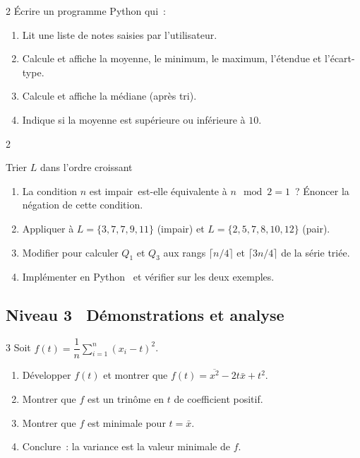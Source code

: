 \begin{exo}{2}
\'Ecrire un programme Python qui~:
\begin{enumerate}
  \item Lit une liste de notes saisies par l'utilisateur.
  \item Calcule et affiche la moyenne, le minimum, le maximum,
        l'\'etendue et l'\'ecart-type.
  \item Calcule et affiche la m\'ediane (apr\`es tri).
  \item Indique si la moyenne est sup\'erieure ou inf\'erieure \`a $10$.
\end{enumerate}
\end{exo}

\begin{exo}{2}

\begin{algorithm}[H]
\caption{Calcul de la m\'ediane d'une s\'erie}
Trier $L$ dans l'ordre croissant\;
\end{algorithm}

\begin{enumerate}
  \item La condition \og$n$ est impair\fg\ est-elle \'equivalente \`a
        \og$n\mod2=1$\fg~? \'Enoncer la n\'egation de cette condition.
  \item Appliquer \`a $L=\{3,7,7,9,11\}$ (impair) et
        $L=\{2,5,7,8,10,12\}$ (pair).
  \item Modifier pour calculer $Q_1$ et $Q_3$ aux rangs
        $\lceil n/4\rceil$ et $\lceil3n/4\rceil$ de la s\'erie tri\'ee.
  \item Impl\'ementer en Python \computer\ et v\'erifier sur les deux exemples.
\end{enumerate}
\end{exo}

\subsection*{\quad Niveau 3 \textemdash\ D\'emonstrations et analyse}

\begin{exo}{3}
Soit $f(t) = \dfrac{1}{n}\displaystyle\sum_{i=1}^n (x_i-t)^2$.
\begin{enumerate}
  \item D\'evelopper $f(t)$ et montrer que
        $f(t) = \overline{x^2} - 2t\bar{x} + t^2$.
  \item Montrer que $f$ est un trin\^ome en $t$ de coefficient positif.
  \item Montrer que $f$ est minimale pour $t=\bar{x}$.
  \item Conclure~: la variance est la valeur minimale de $f$.
\end{enumerate}
\end{exo}

